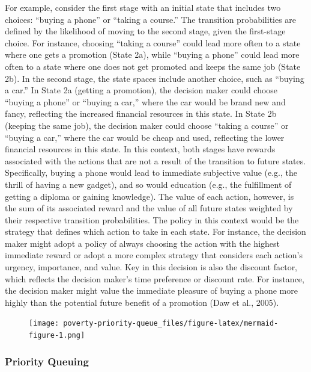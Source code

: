 \documentclass[
]{article}
\begin{document}
For example, consider the first stage with an initial state that
includes two choices: ``buying a phone'' or ``taking a course.'' The
transition probabilities are defined by the likelihood of moving to the
second stage, given the first-stage choice. For instance, choosing
``taking a course'' could lead more often to a state where one gets a
promotion (State 2a), while ``buying a phone'' could lead more often to
a state where one does not get promoted and keeps the same job (State
2b). In the second stage, the state spaces include another choice, such
as ``buying a car.'' In State 2a (getting a promotion), the decision
maker could choose ``buying a phone'' or ``buying a car,'' where the car
would be brand new and fancy, reflecting the increased financial
resources in this state. In State 2b (keeping the same job), the
decision maker could choose ``taking a course'' or ``buying a car,''
where the car would be cheap and used, reflecting the lower financial
resources in this state. In this context, both stages have rewards
associated with the actions that are not a result of the transition to
future states. Specifically, buying a phone would lead to immediate
subjective value (e.g., the thrill of having a new gadget), and so would
education (e.g., the fulfillment of getting a diploma or gaining
knowledge). The value of each action, however, is the sum of its
associated reward and the value of all future states weighted by their
respective transition probabilities. The policy in this context would be
the strategy that defines which action to take in each state. For
instance, the decision maker might adopt a policy of always choosing the
action with the highest immediate reward or adopt a more complex
strategy that considers each action's urgency, importance, and value.
Key in this decision is also the discount factor, which reflects the
decision maker's time preference or discount rate. For instance, the
decision maker might value the immediate pleasure of buying a phone more
highly than the potential future benefit of a promotion (Daw et al.,
2005).

\begin{figure}[H]

{\centering \texttt{[image: poverty-priority-queue\_files/figure-latex/mermaid-figure-1.png]}

}

\end{figure}

\hypertarget{priority-queuing}{%
\subsubsection{Priority Queuing}\label{priority-queuing}}
\end{document}
